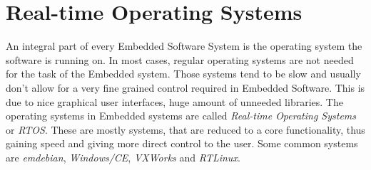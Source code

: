 \documentclass[10pt,a4paper,titlepage,draft]{scrartcl} %
\begin{document}
\section{Real-time Operating Systems}
An integral part of every Embedded Software System is the operating system the software is running on.
In most cases, regular operating systems are not needed for the task of the Embedded system.
Those systems tend to be slow and usually don't allow for a very fine grained control required in Embedded Software.
This is due to nice graphical user interfaces, huge amount of unneeded libraries.
The operating systems in Embedded systems are called \emph{Real-time Operating Systems} or \emph{RTOS}.
These are mostly systems, that are reduced to a core functionality, thus gaining speed and giving more direct control to the user.
Some common systems are \emph{emdebian}, \emph{Windows/CE}, \emph{VXWorks} and \emph{RTLinux}.
\end{document}
